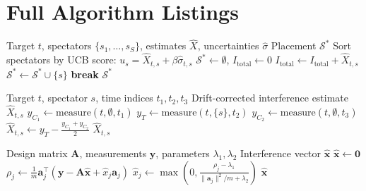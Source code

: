 \documentclass[11pt,twocolumn]{article}
\begin{document}
\section{Full Algorithm Listings}

\begin{algorithm}
\caption{SIT-Safe Scheduling}
\begin{algorithmic}[1]
\REQUIRE Target $t$, spectators $\{s_1, \ldots, s_S\}$, estimates $\hat{X}$, uncertainties $\hat{\sigma}$
\ENSURE Placement $\mathcal{S}^*$
\STATE Sort spectators by UCB score: $u_s = \hat{X}_{t,s} + \beta \hat{\sigma}_{t,s}$
\STATE $\mathcal{S}^* \gets \emptyset$, $I_{\text{total}} \gets 0$
    \STATE $I_{\text{total}} \gets I_{\text{total}} + \hat{X}_{t,s}$
        \STATE $\mathcal{S}^* \gets \mathcal{S}^* \cup \{s\}$
    \ENDIF
        \STATE \textbf{break}
    \ENDIF
\ENDFOR
\RETURN $\mathcal{S}^*$
\end{algorithmic}
\end{algorithm}

\begin{algorithm}
\caption{IRBS C-T-C Measurement}
\begin{algorithmic}[1]
\REQUIRE Target $t$, spectator $s$, time indices $t_1, t_2, t_3$
\ENSURE Drift-corrected interference estimate $\hat{X}_{t,s}$
\STATE $y_{C_1} \gets \text{measure}(t, \emptyset, t_1)$ 
\STATE $y_T \gets \text{measure}(t, \{s\}, t_2)$ 
\STATE $y_{C_2} \gets \text{measure}(t, \emptyset, t_3)$ 
\STATE $\hat{X}_{t,s} \gets y_T - \frac{y_{C_1} + y_{C_2}}{2}$
\RETURN $\hat{X}_{t,s}$
\end{algorithmic}
\end{algorithm}

\begin{algorithm}
\caption{Sparse Tomographic Recovery}
\begin{algorithmic}[1]
\REQUIRE Design matrix $\mathbf{A}$, measurements $\mathbf{y}$, parameters $\lambda_1, \lambda_2$
\ENSURE Interference vector $\hat{\mathbf{x}}$
\STATE $\hat{\mathbf{x}} \gets \mathbf{0}$
\REPEAT
        \STATE $\rho_j \gets \frac{1}{m} \mathbf{a}_j^\top (\mathbf{y} - \mathbf{A}\hat{\mathbf{x}} + \hat{x}_j \mathbf{a}_j)$
        \STATE $\hat{x}_j \gets \max\left(0, \frac{\rho_j - \lambda_1}{\|\mathbf{a}_j\|^2/m + \lambda_2}\right)$
    \ENDFOR
{}
\RETURN $\hat{\mathbf{x}}$
\end{algorithmic}
\end{algorithm}
\end{document}
